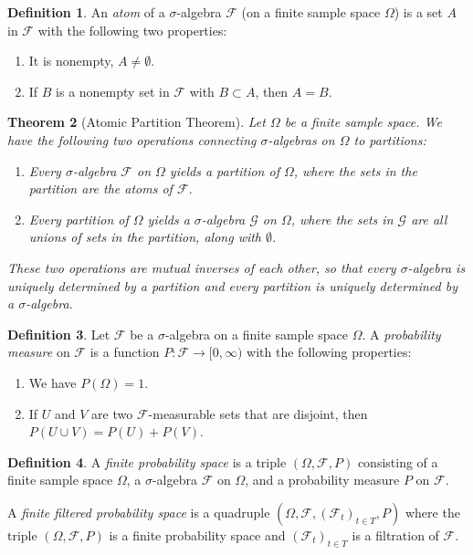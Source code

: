 \documentclass[reqno]{amsart}
\newtheorem{thm}{Theorem}[section]
\theoremstyle{definition}
\newtheorem{defn}[thm]{Definition}
\numberwithin{equation}{section}
\begin{document}
\begin{defn}
An \textit{atom} of a $\sigma$-algebra $\mathcal{F}$ (on a finite sample space $\Omega$) is a set $A$ in $\mathcal{F}$ with the following two properties:
\begin{enumerate}
\item It is nonempty, $A\neq \emptyset$.
\item If $B$ is a nonempty set in $\mathcal{F}$ with $B\subset A$, then $A=B$.
\end{enumerate}
\end{defn}

\begin{thm}[Atomic Partition Theorem]
Let $\Omega$ be a finite sample space. We have the following two operations connecting $\sigma$-algebras on $\Omega$ to partitions:
\begin{enumerate}
\item Every $\sigma$-algebra $\mathcal{F}$ on $\Omega$ yields a partition of $\Omega$, where the sets in the partition are the atoms of $\mathcal{F}$.
\item Every partition of $\Omega$ yields a $\sigma$-algebra $\mathcal{G}$ on $\Omega$, where the sets in $\mathcal{G}$ are all unions of sets in the partition, along with $\emptyset$.
\end{enumerate}
These two operations are mutual inverses of each other, so that every $\sigma$-algebra is uniquely determined by a partition and every partition is uniquely determined by a $\sigma$-algebra.
\end{thm}

\begin{defn}
Let $\mathcal{F}$ be a $\sigma$-algebra on a finite sample space $\Omega$. A \textit{probability measure} on $\mathcal{F}$ is a function $P:\mathcal{F} \to [0,\infty)$ with the following properties:
\begin{enumerate}
\item We have $P(\Omega)=1$.
\item If $U$ and $V$ are two $\mathcal{F}$-measurable sets that are disjoint, then $P(U\cup V) = P(U) + P(V)$.
\end{enumerate}
\end{defn}

\begin{defn}
A \textit{finite probability space} is a triple $(\Omega, \mathcal{F}, P)$ consisting of a finite sample space $\Omega$, a $\sigma$-algebra $\mathcal{F}$ on $\Omega$, and a probability measure $P$ on $\mathcal{F}$.

A \textit{finite filtered probability space} is a quadruple $(\Omega, \mathcal{F}, (\mathcal{F}_t)_{t\in T}, P)$ where the triple $(\Omega, \mathcal{F}, P)$ is a finite probability space and $(\mathcal{F}_t)_{t\in T}$ is a filtration of $\mathcal{F}$.
\end{defn}
\end{document}
